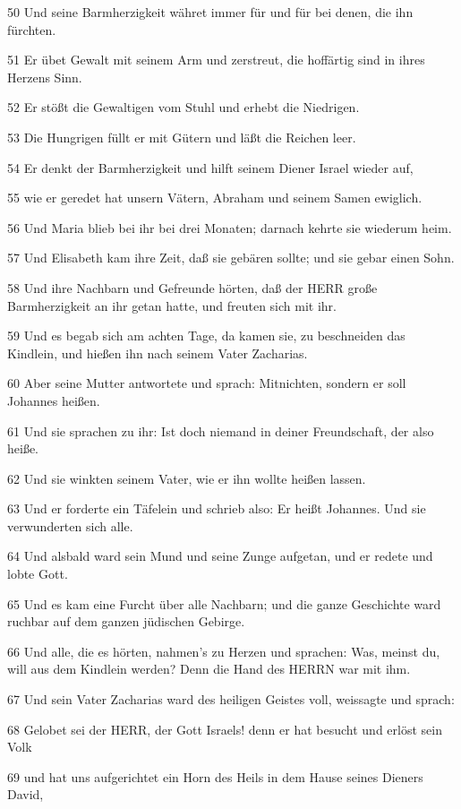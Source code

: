 \par 50 Und seine Barmherzigkeit währet immer für und für bei denen, die ihn fürchten.
\par 51 Er übet Gewalt mit seinem Arm und zerstreut, die hoffärtig sind in ihres Herzens Sinn.
\par 52 Er stößt die Gewaltigen vom Stuhl und erhebt die Niedrigen.
\par 53 Die Hungrigen füllt er mit Gütern und läßt die Reichen leer.
\par 54 Er denkt der Barmherzigkeit und hilft seinem Diener Israel wieder auf,
\par 55 wie er geredet hat unsern Vätern, Abraham und seinem Samen ewiglich.
\par 56 Und Maria blieb bei ihr bei drei Monaten; darnach kehrte sie wiederum heim.
\par 57 Und Elisabeth kam ihre Zeit, daß sie gebären sollte; und sie gebar einen Sohn.
\par 58 Und ihre Nachbarn und Gefreunde hörten, daß der HERR große Barmherzigkeit an ihr getan hatte, und freuten sich mit ihr.
\par 59 Und es begab sich am achten Tage, da kamen sie, zu beschneiden das Kindlein, und hießen ihn nach seinem Vater Zacharias.
\par 60 Aber seine Mutter antwortete und sprach: Mitnichten, sondern er soll Johannes heißen.
\par 61 Und sie sprachen zu ihr: Ist doch niemand in deiner Freundschaft, der also heiße.
\par 62 Und sie winkten seinem Vater, wie er ihn wollte heißen lassen.
\par 63 Und er forderte ein Täfelein und schrieb also: Er heißt Johannes. Und sie verwunderten sich alle.
\par 64 Und alsbald ward sein Mund und seine Zunge aufgetan, und er redete und lobte Gott.
\par 65 Und es kam eine Furcht über alle Nachbarn; und die ganze Geschichte ward ruchbar auf dem ganzen jüdischen Gebirge.
\par 66 Und alle, die es hörten, nahmen's zu Herzen und sprachen: Was, meinst du, will aus dem Kindlein werden? Denn die Hand des HERRN war mit ihm.
\par 67 Und sein Vater Zacharias ward des heiligen Geistes voll, weissagte und sprach:
\par 68 Gelobet sei der HERR, der Gott Israels! denn er hat besucht und erlöst sein Volk
\par 69 und hat uns aufgerichtet ein Horn des Heils in dem Hause seines Dieners David,
